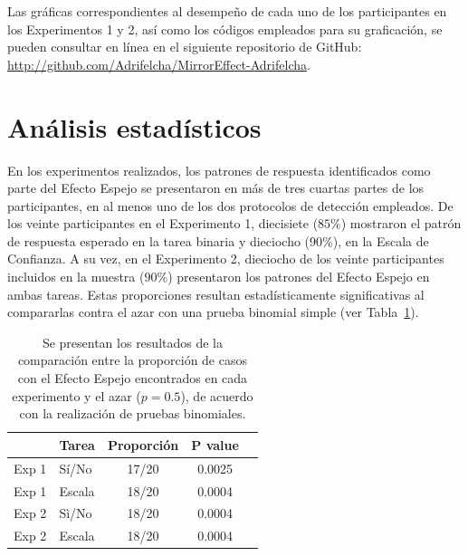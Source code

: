 Las gráficas correspondientes al desempeño de cada uno de los participantes en los Experimentos 1 y 2, así como los códigos empleados para su graficación, se pueden consultar en línea en el siguiente repositorio de GitHub: \href{http://github.com/Adrifelcha/MirrorEffect-Adrifelcha}{http://github.com/Adrifelcha/MirrorEffect-Adrifelcha}.\\




































\section{Análisis estadísticos}

En los experimentos realizados, los patrones de respuesta identificados como parte del Efecto Espejo se presentaron en más de tres cuartas partes de los participantes, en al menos uno de los dos protocolos de detección empleados. De los veinte participantes en el Experimento 1, diecisiete ($85\%$) mostraron el patrón de respuesta esperado en la tarea binaria y dieciocho ($90\%$), en la Escala de Confianza. A su vez, en el Experimento 2, dieciocho de los veinte participantes incluidos en la muestra ($90\%$) presentaron los patrones del Efecto Espejo en ambas tareas. Estas proporciones resultan estadísticamente significativas al compararlas contra el azar con una prueba binomial simple (ver Tabla~\ref{Tabla_Binom}).\\

\begin{table}
\caption[Pruebas Binomiales que comparan la proporción de patrones de Efecto Espejo encontrados]{Se presentan los resultados de la comparación entre la proporción de casos con el Efecto Espejo encontrados en cada experimento y el azar ($p=0.5$), de acuerdo con la realización de pruebas binomiales.}
\label{Tabla_Binom}
\centering
\begin{tabular}{l l | c c c}
\toprule
\textbf{} & \textbf{Tarea} & \textbf{Proporción} & \textbf{P value}\\
\midrule
Exp 1 & Sí/No & 17/20 & 0.0025 \\
Exp 1 & Escala & 18/20 & 0.0004\\
Exp 2 & Sì/No & 18/20 & 0.0004\\
Exp 2 & Escala & 18/20 & 0.0004\\
\bottomrule
\end{tabular}
\end{table}


